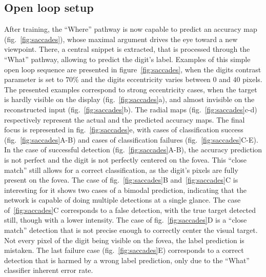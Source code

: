 \subsection{Open loop setup}
After training, the ``Where'' pathway is now capable to predict an accuracy map (fig.~\ref{fig:saccades}), whose maximal argument drives the eye toward a new viewpoint. There, a central snippet is extracted, that is processed through the ``What'' pathway, allowing to predict the digit's label. Examples of this simple open loop sequence are presented in figure~\ref{fig:saccades}, when the digits contrast parameter is set to $70\%$ and the digits eccentricity varies between $0$ and $40$ pixels. The presented examples correspond to strong eccentricity cases, when the target is hardly visible on the display (fig.~\ref{fig:saccades}a), and almost invisible on the reconstructed input (fig.~\ref{fig:saccades}b). The radial maps (fig.~\ref{fig:saccades}c-d) respectively represent the actual and the predicted accuracy maps. The final focus is represented in fig.~\ref{fig:saccades}e, with cases of classification success (fig.~\ref{fig:saccades}A-B) and cases of classification failures (fig.~\ref{fig:saccades}C-E).
In the case of successful detection (fig.~\ref{fig:saccades}A-B), the accuracy prediction is not perfect and the digit is not perfectly centered on the fovea. This ``close match'' still allows for a correct classification, as the digit's pixels are fully present on the fovea. The case of fig.~\ref{fig:saccades}B and~\ref{fig:saccades}C
 is interesting for it shows two cases of a bimodal prediction, indicating that the network is capable of doing multiple detections at a single glance. The case of~\ref{fig:saccades}C corresponds to a false detection, with the true target detected still, though with a lower intensity. The case of fig.~\ref{fig:saccades}D is a ``close match'' detection that is not precise enough to correctly center the visual target. Not every pixel of the digit being visible on the fovea, the label prediction is mistaken.
The last failure case (fig.~\ref{fig:saccades}E) corresponds to a correct detection that is harmed by a wrong label prediction, only due to the ``What'' classifier inherent error rate.



